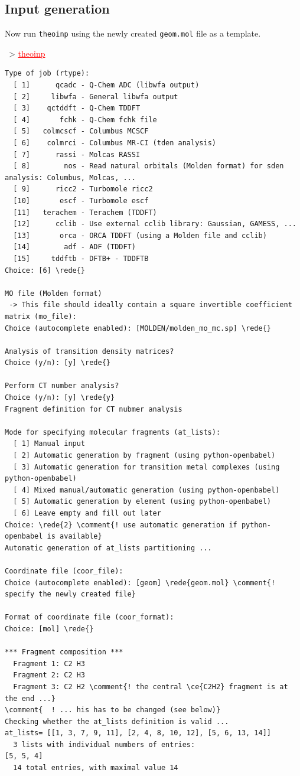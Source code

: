 \documentclass[DIV=12,headings=normal]{scrartcl}
\newcommand{\comment}[1]{\textcolor{blue}{#1}}
\newcommand{\redl}[1]{{\textcolor{red}{\underline{#1}}}}
\newcommand{\rede}[1]{\redl{#1 <ENTER>}}
\newcommand{\comm}[1]{
\small
~> \redl{#1}
\normalsize
}
\newcounter{number}
\begin{document}
\subsection{Input generation}
\label{sec:inpcol}
Now run \texttt{theoinp} using the newly created \texttt{geom.mol} file as a template.

\comm{theoinp}

\scriptsize
\begin{Verbatim}[commandchars=\\\{\}]
Type of job (rtype):
  [ 1]      qcadc - Q-Chem ADC (libwfa output)
  [ 2]     libwfa - General libwfa output
  [ 3]    qctddft - Q-Chem TDDFT
  [ 4]       fchk - Q-Chem fchk file
  [ 5]   colmcscf - Columbus MCSCF
  [ 6]    colmrci - Columbus MR-CI (tden analysis)
  [ 7]      rassi - Molcas RASSI
  [ 8]        nos - Read natural orbitals (Molden format) for sden analysis: Columbus, Molcas, ...
  [ 9]      ricc2 - Turbomole ricc2
  [10]       escf - Turbomole escf
  [11]   terachem - Terachem (TDDFT)
  [12]      cclib - Use external cclib library: Gaussian, GAMESS, ...
  [13]       orca - ORCA TDDFT (using a Molden file and cclib)
  [14]        adf - ADF (TDDFT)
  [15]     tddftb - DFTB+ - TDDFTB
Choice: [6] \rede{}

MO file (Molden format)
 -> This file should ideally contain a square invertible coefficient matrix (mo_file):
Choice (autocomplete enabled): [MOLDEN/molden_mo_mc.sp] \rede{}

Analysis of transition density matrices?
Choice (y/n): [y] \rede{}

Perform CT number analysis?
Choice (y/n): [y] \rede{y}
Fragment definition for CT nubmer analysis

Mode for specifying molecular fragments (at_lists):
  [ 1] Manual input
  [ 2] Automatic generation by fragment (using python-openbabel)
  [ 3] Automatic generation for transition metal complexes (using python-openbabel)
  [ 4] Mixed manual/automatic generation (using python-openbabel)
  [ 5] Automatic generation by element (using python-openbabel)
  [ 6] Leave empty and fill out later
Choice: \rede{2} \comment{! use automatic generation if python-openbabel is available}
Automatic generation of at_lists partitioning ...

Coordinate file (coor_file):
Choice (autocomplete enabled): [geom] \rede{geom.mol} \comment{! specify the newly created file}

Format of coordinate file (coor_format):
Choice: [mol] \rede{}

*** Fragment composition ***
  Fragment 1: C2 H3
  Fragment 2: C2 H3
  Fragment 3: C2 H2 \comment{! the central \ce{C2H2} fragment is at the end ...}
\comment{  ! ... his has to be changed (see below)}
Checking whether the at_lists definition is valid ...
at_lists= [[1, 3, 7, 9, 11], [2, 4, 8, 10, 12], [5, 6, 13, 14]]
  3 lists with individual numbers of entries:
[5, 5, 4]
  14 total entries, with maximal value 14


\end{Verbatim}
\end{document}
